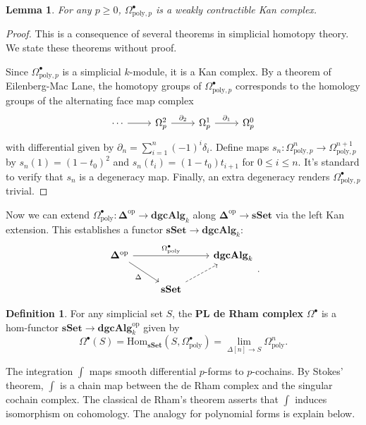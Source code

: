 \documentclass[psamsfonts]{amsart}
\newtheorem{lem}{Lemma}[section]
\theoremstyle{definition}
\newtheorem{defn}{Definition}[section]
\newcommand{\sSet}{\mathbf{sSet}}
\newcommand{\dgcAlg}{\mathbf{dgcAlg}}
\newcommand{\Hom}{\mathrm{Hom}}
\numberwithin{equation}{section}
\begin{document}
\begin{lem}
For any $p\geq0$, $\Omega^\bullet_{\mathrm{poly},p}$ is a weakly contractible Kan complex.
\end{lem}
\begin{proof}
This is a consequence of several theorems in simplicial homotopy theory. We state these theorems without proof.\medbreak

Since $\Omega^\bullet_{\textrm{poly},p}$ is a simplicial $k$-module, it is a Kan complex. By a theorem of Eilenberg-Mac Lane, the homotopy groups of $\Omega^\bullet_{\textrm{poly},p}$ corresponds to the homology groups of the alternating face map complex
\[\begin{tikzcd}
\cdots\arrow[r]&\Omega^2_p\arrow[r,"\partial_2"]&\Omega^1_p\arrow[r,"\partial_1"]&\Omega^0_p\end{tikzcd}\]
with differential given by $\partial_n=\sum_{i=1}^n(-1)^i\delta_i$. Define maps $s_n:\Omega^n_{\textrm{poly},p}\to\Omega^{n+1}_{\textrm{poly},p}$ by $s_n(1)=(1-t_0)^2$ and $s_n(t_i)=(1-t_0)t_{i+1}$ for $0\leq i\leq n$. It's standard to verify that $s_n$ is a degeneracy map. Finally, an extra degeneracy renders $\Omega^\bullet_{\textrm{poly},p}$ trivial.
\end{proof}

Now we can extend $\Omega^\bullet_\textrm{poly}:\mathbf{\Delta}^\textrm{op}\to\dgcAlg_k$ along $\mathbf{\Delta}^\textrm{op}\to\sSet$ via the left Kan extension. This establishes a functor $\sSet\to\dgcAlg_k$:
\[\begin{tikzcd}
\mathbf{\Delta}^\textrm{op}\arrow[swap]{dr}{\Delta}\arrow{rr}{\Omega^\bullet_\textrm{poly}}&&\dgcAlg_k\\
&\sSet\arrow[swap,near start,dashed]{ur}
\end{tikzcd}.\]

\begin{defn}
For any simplicial set $S$, the \textbf{PL de Rham complex} $\Omega^\bullet$ is a hom-functor $\sSet\to\dgcAlg_k^\mathrm{op}$ given by
\[\Omega^\bullet(S)=\Hom_\sSet(S,\Omega^\bullet_\textrm{poly})=\textstyle{\lim_{\Delta[n]\to S}\Omega^n_\textrm{poly}}.\]
\end{defn}

The integration $\int$ maps smooth differential $p$-forms to $p$-cochains. By Stokes' theorem, $\int$ is a chain map between the de Rham complex and the singular cochain complex. The classical de Rham's theorem asserts that $\int$ induces isomorphism on cohomology. The analogy for polynomial forms is explain below.
\end{document}
